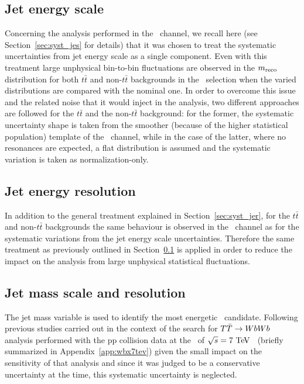 \subsection{Jet energy scale}\label{sec:wbx_syst_jes}
Concerning the analysis performed in the \tight\ channel,
we recall here (see Section~\ref{sec:syst_jes} for details)
that it was chosen to treat the systematic uncertainties from
jet energy scale as a single component. Even with this treatment
large unphysical bin-to-bin fluctuations are observed
in the $m_{\rm reco}$ distribution for both $t\bar{t}$ and non-$t\bar{t}$
backgrounds in the \tight\ selection when the varied distributions
are compared with the nominal one. In order to overcome this issue
and the related noise that it would inject in the analysis, two different
approaches are followed for the $t\bar{t}$ and the non-$t\bar{t}$ background:
for the former, the systematic uncertainty shape is taken from the smoother
(because of the higher statistical population) template of the \loose\
channel, while in the case of the latter, where no resonances are expected,
a flat distribution is assumed and the systematic variation is taken as
normalization-only.

\subsection{Jet energy resolution}
In addition to the general treatment explained in Section~\ref{sec:syst_jer},
for the $t\bar{t}$ and non-$t\bar{t}$ backgrounds 
the same behaviour is observed in the \tight\ channel
as for the systematic variations from the jet energy scale uncertainties.
Therefore the same treatment as previously outlined in 
Section~\ref{sec:wbx_syst_jes} is applied in order to 
reduce the impact on the analysis from
large unphysical statistical fluctuations.

\subsection{Jet mass scale and resolution}
The jet mass variable is used to identify the most 
energetic \wi\ candidate.
Following previous studies carried out in 
the context of the search for $\TTbar\to WbWb$
analysis performed with the pp collision data
at the \cme\ of $\sqrt{s}=7\tev$~\cite{ATLAS:2012qe}
(briefly summarized in Appendix~\ref{app:wbx7tev})
given the small impact on the sensitivity of 
that analysis and since it was judged to be a 
conservative uncertainty at the time, 
this systematic uncertainty is neglected.

